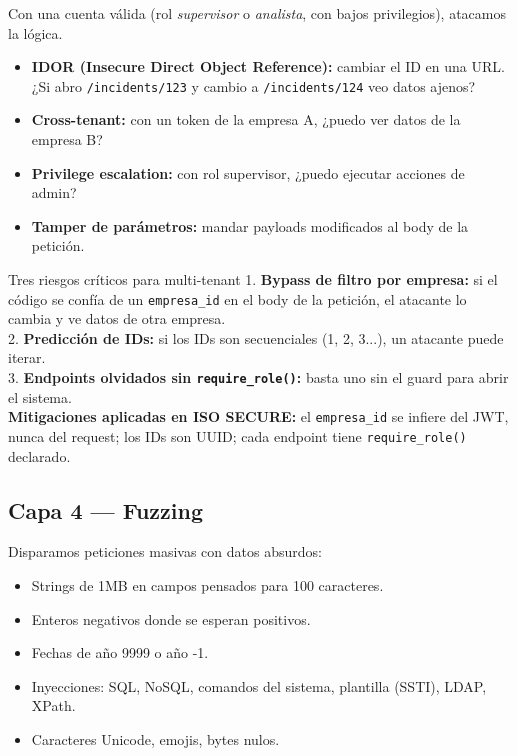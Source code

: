 \documentclass[12pt,a4paper,oneside]{article}
\begin{document}
Con una cuenta válida (rol \textit{supervisor} o \textit{analista}, con bajos privilegios), atacamos la lógica.

\begin{itemize}[leftmargin=*]
  \item \textbf{IDOR (Insecure Direct Object Reference):} cambiar el ID en una URL. ¿Si abro \texttt{/incidents/123} y cambio a \texttt{/incidents/124} veo datos ajenos?
  \item \textbf{Cross-tenant:} con un token de la empresa A, ¿puedo ver datos de la empresa B?
  \item \textbf{Privilege escalation:} con rol supervisor, ¿puedo ejecutar acciones de admin?
  \item \textbf{Tamper de parámetros:} mandar payloads modificados al body de la petición.
\end{itemize}

\begin{dangerbox}{Tres riesgos críticos para multi-tenant}
1. \textbf{Bypass de filtro por empresa:} si el código se confía de un \texttt{empresa\_id} en el body de la petición, el atacante lo cambia y ve datos de otra empresa.\\
2. \textbf{Predicción de IDs:} si los IDs son secuenciales (1, 2, 3...), un atacante puede iterar.\\
3. \textbf{Endpoints olvidados sin \texttt{require\_role()}:} basta uno sin el guard para abrir el sistema.\\[1ex]
\textbf{Mitigaciones aplicadas en ISO SECURE:} el \texttt{empresa\_id} se infiere del JWT, nunca del request; los IDs son UUID; cada endpoint tiene \texttt{require\_role()} declarado.
\end{dangerbox}

\subsection{Capa 4 --- Fuzzing}

Disparamos peticiones masivas con datos absurdos:

\begin{itemize}[leftmargin=*]
  \item Strings de 1MB en campos pensados para 100 caracteres.
  \item Enteros negativos donde se esperan positivos.
  \item Fechas de año 9999 o año -1.
  \item Inyecciones: SQL, NoSQL, comandos del sistema, plantilla (SSTI), LDAP, XPath.
  \item Caracteres Unicode, emojis, bytes nulos.
\end{itemize}
\end{document}
